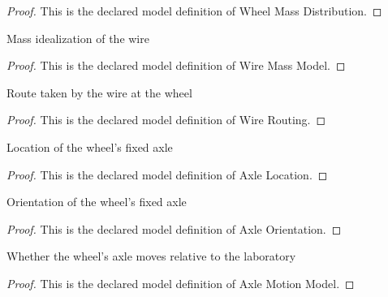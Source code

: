 \begin{proof}
  This is the declared model definition of Wheel Mass Distribution.
\end{proof}
\begin{definition}
  \label{def:physics:phyx-mini-0771:phyxminiproblems-problemphyxmini0771-wiremassmodel}
  Mass idealization of the wire
\end{definition}
\begin{proof}
  This is the declared model definition of Wire Mass Model.
\end{proof}
\begin{definition}
  \label{def:physics:phyx-mini-0771:phyxminiproblems-problemphyxmini0771-wirerouting}
  Route taken by the wire at the wheel
\end{definition}
\begin{proof}
  This is the declared model definition of Wire Routing.
\end{proof}
\begin{definition}
  \label{def:physics:phyx-mini-0771:phyxminiproblems-problemphyxmini0771-axlelocation}
  Location of the wheel's fixed axle
\end{definition}
\begin{proof}
  This is the declared model definition of Axle Location.
\end{proof}
\begin{definition}
  \label{def:physics:phyx-mini-0771:phyxminiproblems-problemphyxmini0771-axleorientation}
  Orientation of the wheel's fixed axle
\end{definition}
\begin{proof}
  This is the declared model definition of Axle Orientation.
\end{proof}
\begin{definition}
  \label{def:physics:phyx-mini-0771:phyxminiproblems-problemphyxmini0771-axlemotionmodel}
  Whether the wheel's axle moves relative to the laboratory
\end{definition}
\begin{proof}
  This is the declared model definition of Axle Motion Model.
\end{proof}
